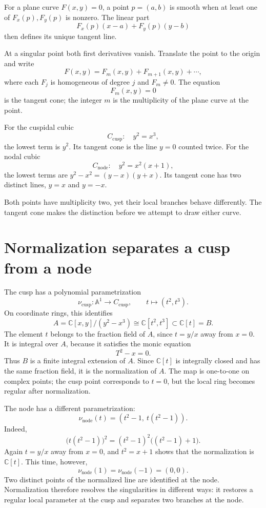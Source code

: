 For a plane curve \(F(x,y)=0\), a point \(p=(a,b)\) is smooth when at least one of \(F_x(p),F_y(p)\) is nonzero. The linear part
\[
 F_x(p)(x-a)+F_y(p)(y-b)
\]
then defines its unique tangent line.

At a singular point both first derivatives vanish. Translate the point to the origin and write
\[
 F(x,y)=F_m(x,y)+F_{m+1}(x,y)+\cdots,
\]
where each \(F_j\) is homogeneous of degree \(j\) and \(F_m\ne0\). The equation
\[
 F_m(x,y)=0
\]
is the tangent cone; the integer \(m\) is the multiplicity of the plane curve at the point.

For the cuspidal cubic
\[
 C_{\mathrm{cusp}}:\quad y^2=x^3,
\]
the lowest term is \(y^2\). Its tangent cone is the line \(y=0\) counted twice. For the nodal cubic
\[
 C_{\mathrm{node}}:\quad y^2=x^2(x+1),
\]
the lowest terms are \(y^2-x^2=(y-x)(y+x)\). Its tangent cone has two distinct lines, \(y=x\) and \(y=-x\).

Both points have multiplicity two, yet their local branches behave differently. The tangent cone makes the distinction before we attempt to draw either curve.

\section{Normalization separates a cusp from a node}

The cusp has a polynomial parametrization
\[
 \nu_{\mathrm{cusp}}:\mathbb A^1\longrightarrow C_{\mathrm{cusp}},
 \qquad t\longmapsto(t^2,t^3).
\]
On coordinate rings, this identifies
\[
 A=\mathbb C[x,y]/(y^2-x^3)
   \cong\mathbb C[t^2,t^3]\subset\mathbb C[t]=B.
\]
The element \(t\) belongs to the fraction field of \(A\), since \(t=y/x\) away from \(x=0\). It is integral over \(A\), because it satisfies the monic equation
\[
 T^2-x=0.
\]
Thus \(B\) is a finite integral extension of \(A\). Since \(\mathbb C[t]\) is integrally closed and has the same fraction field, it is the normalization of \(A\). The map is one-to-one on complex points; the cusp point corresponds to \(t=0\), but the local ring becomes regular after normalization.

The node has a different parametrization:
\[
 \nu_{\mathrm{node}}(t)
  =(t^2-1,\ t(t^2-1)).
\]
Indeed,
\[
 \bigl(t(t^2-1)\bigr)^2
 =(t^2-1)^2\bigl((t^2-1)+1\bigr).
\]
Again \(t=y/x\) away from \(x=0\), and \(t^2=x+1\) shows that the normalization is \(\mathbb C[t]\). This time, however,
\[
 \nu_{\mathrm{node}}(1)=\nu_{\mathrm{node}}(-1)=(0,0).
\]
Two distinct points of the normalized line are identified at the node. Normalization therefore resolves the singularities in different ways: it restores a regular local parameter at the cusp and separates two branches at the node.

